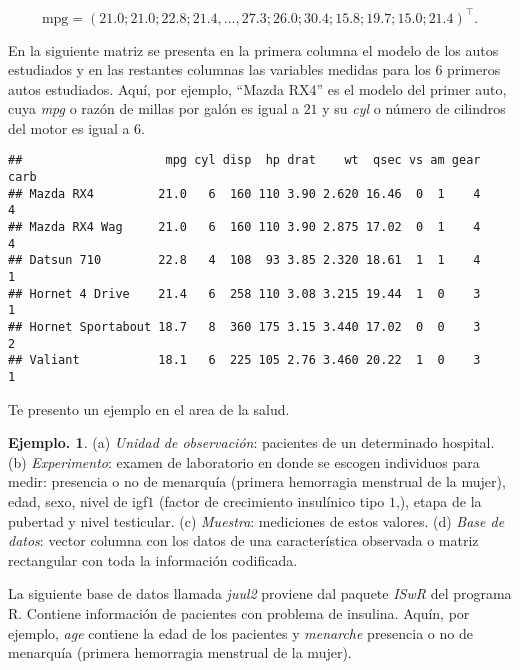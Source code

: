 \documentclass[]{book}
\theoremstyle{definition}
\theoremstyle{definition}
\newtheorem{example}{Ejemplo.}[chapter]
\theoremstyle{definition}
\theoremstyle{remark}
\begin{document}
\[\mbox{mpg}=(21.0 ; 21.0 ; 22.8 ; 21.4 ,\ldots, 27.3 ;
26.0 ; 30.4 ; 15.8 ; 19.7 ; 15.0 ;
21.4)^\top. \]

En la siguiente matriz se presenta en la primera columna
el modelo de los autos estudiados y en
las restantes columnas las variables medidas para los \(6\)
primeros autos estudiados. Aquí, por
ejemplo, ``Mazda RX4'' es el modelo del primer auto, cuya
\emph{mpg} o razón de millas por galón es
igual a \(21\) y su \emph{cyl} o número de cilindros del motor
es igual a \(6\).

\begin{verbatim}
##                    mpg cyl disp  hp drat    wt  qsec vs am gear carb
## Mazda RX4         21.0   6  160 110 3.90 2.620 16.46  0  1    4    4
## Mazda RX4 Wag     21.0   6  160 110 3.90 2.875 17.02  0  1    4    4
## Datsun 710        22.8   4  108  93 3.85 2.320 18.61  1  1    4    1
## Hornet 4 Drive    21.4   6  258 110 3.08 3.215 19.44  1  0    3    1
## Hornet Sportabout 18.7   8  360 175 3.15 3.440 17.02  0  0    3    2
## Valiant           18.1   6  225 105 2.76 3.460 20.22  1  0    3    1
\end{verbatim}

Te presento un ejemplo en el area de la salud.

\begin{example}
\protect\hypertarget{exm:unnamed-chunk-44}{}{\label{exm:unnamed-chunk-44} }(a) \emph{Unidad de observación}: pacientes de un determinado
hospital. (b) \emph{Experimento}: examen de
laboratorio en donde se escogen individuos para medir:
presencia o no de menarquía (primera
hemorragia menstrual de la mujer), edad, sexo, nivel de
igf\(1\) (factor de crecimiento insulínico
tipo \(1\),), etapa de la pubertad y nivel testicular. (c)
\emph{Muestra}: mediciones de estos valores.
(d) \emph{Base de datos}: vector columna con los datos de una
característica observada o matriz
rectangular con toda la información codificada.
\end{example}

La siguiente base de datos llamada \emph{juul2} proviene dal
paquete \emph{ISwR} del programa R. Contiene
información de pacientes con problema de insulina. Aquín,
por ejemplo, \emph{age} contiene la edad de
los pacientes y \emph{menarche} presencia o no de menarquía
(primera hemorragia menstrual de la
mujer).
\end{document}
